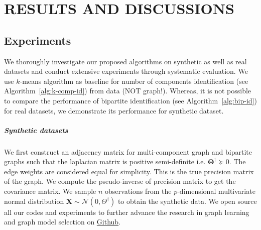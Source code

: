 \chapter{RESULTS AND DISCUSSIONS}
\label{chap:result}

\section{Experiments}
We thoroughly investigate our proposed algorithms on synthetic as well as real datasets and conduct extensive experiments through systematic evaluation. We use $k$-means algorithm as baseline for number of components identification (see Algorithm~\ref{alg:k-comp-id}) from data (NOT graph!). Whereas, it is not possible to compare the performance of bipartite identification (see Algorithm~\ref{alg:bip-id}) for real datasets, we demonstrate its performance for synthetic dataset.
\paragraph{Synthetic datasets} We first construct an adjacency matrix for multi-component graph and bipartite graphs such that the laplacian matrix is positive semi-definite i.e. $\mathbf{\Theta}^{\dagger} \succeq 0$. The edge weights are considered equal for simplicity. This is the true precision matrix of the graph. We compute the pseudo-inverse of precision matrix to get the covariance matrix. We sample $n$ observations from the $p$-dimensional multivariate normal distribution $\mathbf{X} \sim \mathcal{N}\left(0, \Theta^{\dagger}\right)$ to obtain the synthetic data. We open source all our codes and experiments to further advance the research in graph learning and graph model selection on \href{https://github.com/anshul3899/Structured-Graph-Learning}{Github}.

